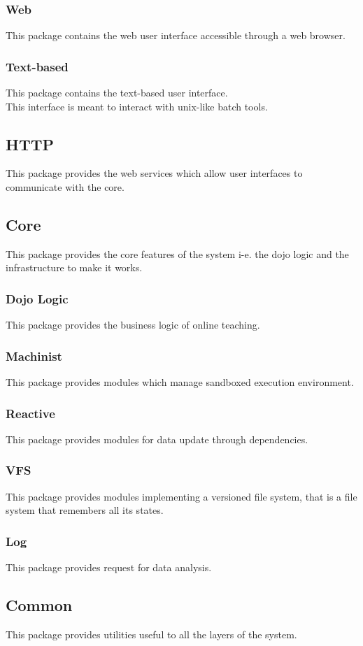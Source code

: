 		\subsubsection{Web}
			This package contains the web user interface accessible through a web browser.
		\subsubsection{Text-based}
			This package contains the text-based user interface.\\
			This interface is meant to interact with unix-like batch tools.
	\subsection{HTTP}
		This package provides the web services which allow user interfaces to communicate with the core.
	\subsection{Core}
		This package provides the core features of the system i-e. the dojo logic and the infrastructure to make it works.
		\subsubsection{Dojo Logic}
			This package provides the business logic of online teaching.
		\subsubsection{Machinist}
			This package provides modules which manage sandboxed execution environment.
		\subsubsection{Reactive}
			This package provides modules for data update through dependencies.
		\subsubsection{VFS}
			This package provides modules implementing a versioned file system, that is a file system that remembers all its states.
		\subsubsection{Log}
			This package provides request for data analysis.
	\subsection{Common}
		This package provides utilities useful to all the layers of the system.
